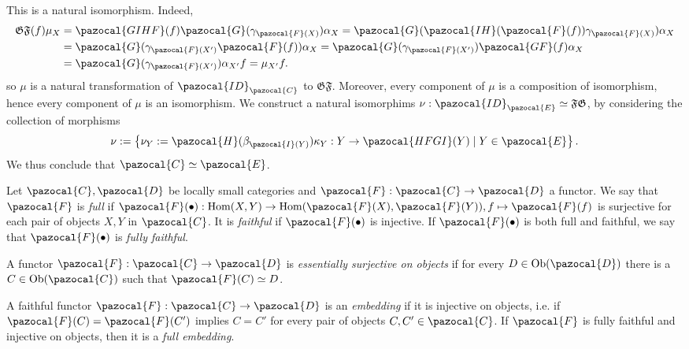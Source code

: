 \begin{remark}
\begin{itemize}
$$            $$
            This is a natural isomorphism. Indeed, 
            \begin{align*}
                \mathfrak{GF}(f)\mu_X&= \pazocal{GIHF}(f)\pazocal{G}(\gamma_{\pazocal{F}(X)})\alpha_X = \pazocal{G}(\pazocal{IH}(\pazocal{F}(f))\gamma_{\pazocal{F}(X)})\alpha_X\\ 
                &= \pazocal{G}(\gamma_{\pazocal{F}(X')}\pazocal{F}(f))\alpha_X = \pazocal{G}(\gamma_{\pazocal{F}(X')})\pazocal{GF}(f)\alpha_X\\
                &= \pazocal{G}(\gamma_{\pazocal{F}(X')})\alpha_{X'}f = \mu_{X'}f. 
            \end{align*}
            so $\mu$ is a natural transformation of $\pazocal{ID}_{\pazocal{C}}$ to $\mathfrak{GF}$. Moreover, every component of $\mu$ is a composition of isomorphism, hence every component of $\mu$ is an isomorphism. We construct a natural isomorphims $\nu : \pazocal{ID}_\pazocal{E}\simeq \mathfrak{F}\mathfrak{G}$, by considering the collection of morphisms 
            $$
                \nu := \left\{ \nu_Y:= \pazocal{H}(\beta_{\pazocal{I}(Y)})\kappa_Y :Y \rightarrow \pazocal{HFGI}(Y)\mid Y\in\pazocal{E}\right\}.
            $$
            We thus conclude that $\pazocal{C}\simeq \pazocal{E}$.
        \end{itemize}
    \end{remark}
    \begin{definition}
        Let $\pazocal{C},\pazocal{D}$ be locally small categories and $\pazocal{F} : \pazocal{C}\rightarrow \pazocal{D}$ a functor. We say that $\pazocal{F}$ is \emph{full} if $\pazocal{F}(\bullet):\Hom(X,Y)\rightarrow \Hom(\pazocal{F}(X),\pazocal{F}(Y)), f\mapsto \pazocal{F}(f)$ is surjective for each pair of objects $X,Y$ in $\pazocal{C}$. It is \emph{faithful} if $\pazocal{F}(\bullet)$ is injective. If $\pazocal{F}(\bullet)$ is both full and faithful, we say that $\pazocal{F}(\bullet)$ is \emph{fully faithful}.
    \end{definition}
    \begin{definition}
        A functor $\pazocal{F} : \pazocal{C}\rightarrow \pazocal{D}$ is \emph{essentially surjective on objects} if for every $D\in \Ob(\pazocal{D})$ there is a $C\in \Ob(\pazocal{C})$ such that $\pazocal{F}(C)\simeq D$. 
    \end{definition}
    \begin{definition}
        A faithful functor $\pazocal{F}:\pazocal{C}\rightarrow\pazocal{D}$ is an \emph{embedding} if it is injective on objects, i.e. if $\pazocal{F}(C)=\pazocal{F}(C')$ implies $C=C'$ for every pair of objects $C,C'\in \pazocal{C}$. If $\pazocal{F}$ is fully faithful and injective on objects, then it is a \emph{full embedding}.
    \end{definition}
